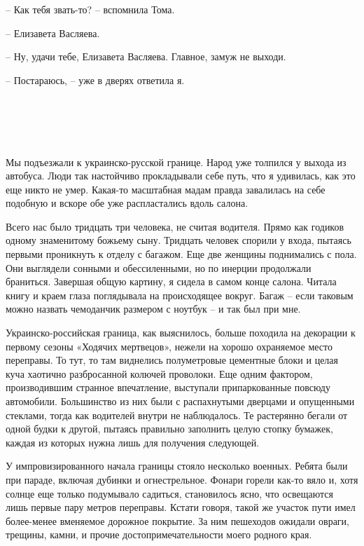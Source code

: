 \documentclass[
]{book}
\begin{document}
-- Как тебя звать-то? -- вспомнила Тома.

-- Елизавета Васляева.

-- Ну, удачи тебе, Елизавета Васляева. Главное, замуж не выходи.

-- Постараюсь, -- уже в дверях ответила я.

\hypertarget{chapter-5}{%
\chapter{~}\label{chapter-5}}

Мы подъезжали к украинско-русской границе. Народ уже толпился у выхода из автобуса. Люди так настойчиво прокладывали себе путь, что я удивилась, как это еще никто не умер. Какая-то масштабная мадам правда завалилась на себе подобную и вскоре обе уже распластались вдоль салона.

Всего нас было тридцать три человека, не считая водителя. Прямо как годиков одному знаменитому божьему сыну. Тридцать человек спорили у входа, пытаясь первыми проникнуть к отделу с багажом. Еще две женщины поднимались с пола. Они выглядели сонными и обессиленными, но по инерции продолжали браниться. Завершая общую картину, я сидела в самом конце салона. Читала книгу и краем глаза поглядывала на происходящее вокруг. Багаж -- если таковым можно назвать чемоданчик размером с ноутбук -- и так был при мне.

Украинско-российская граница, как выяснилось, больше походила на декорации к первому сезоны «Ходячих мертвецов», нежели на хорошо охраняемое место переправы. То тут, то там виднелись полуметровые цементные блоки и целая куча хаотично разбросанной колючей проволоки. Еще одним фактором, производившим странное впечатление, выступали припаркованные повсюду автомобили. Большинство из них были с распахнутыми дверцами и опущенными стеклами, тогда как водителей внутри не наблюдалось. Те растерянно бегали от одной будки к другой, пытаясь правильно заполнить целую стопку бумажек, каждая из которых нужна лишь для получения следующей.

У импровизированного начала границы стояло несколько военных. Ребята были при параде, включая дубинки и огнестрельное. Фонари горели как-то вяло и, хотя солнце еще только подумывало садиться, становилось ясно, что освещаются лишь первые пару метров переправы. Кстати говоря, такой же участок пути имел более-менее вменяемое дорожное покрытие. За ним пешеходов ожидали овраги, трещины, камни, и прочие достопримечательности моего родного края.
\end{document}
